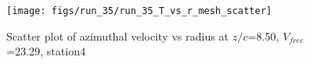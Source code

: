 \begin{figure}[H]
\centering
\texttt{[image: figs/run\_35/run\_35\_T\_vs\_r\_mesh\_scatter]}
\caption{Scatter plot of azimuthal velocity vs radius at $z/c$=8.50, $V_{free}$=23.29, station4}
\label{fig:run_35_T_vs_r_mesh_scatter}
\end{figure}


